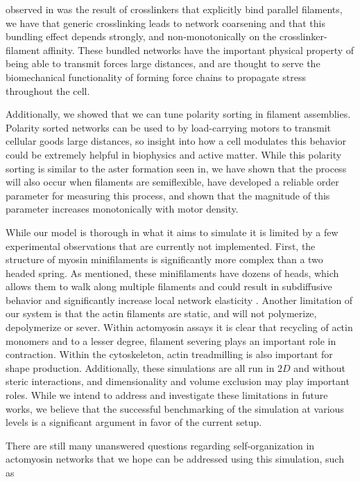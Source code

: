 \documentclass[12pt]{article}
\begin{document}
observed in \cite{kim2009b} was the result of crosslinkers that explicitly bind
parallel filaments, we have that generic crosslinking leads to network
coarsening and that this bundling effect depends strongly, and non-monotonically
on the crosslinker-filament affinity. These bundled networks have the important
physical property of being able to transmit forces large distances, and are
thought to serve the biomechanical functionality of forming force chains to
propagate stress throughout the cell. 
\par
Additionally, we showed that we can tune polarity sorting in filament assemblies. 
Polarity sorted networks can be used to by load-carrying motors to transmit 
cellular goods large distances, so insight into how a cell modulates this
behavior could be extremely helpful in biophysics and active matter. While this
polarity sorting is similar to the aster formation seen in\cite{nedelec2002,
gordon2012}, we have shown that the process will also occur when filaments are
semiflexible, have developed a reliable order parameter for measuring this
process, and shown that the magnitude of this parameter increases
monotonically with motor density. 
\par
While our model is thorough in what it aims to simulate it is limited by a few
experimental observations that are currently not implemented. First, the
structure of myosin minifilaments is significantly more complex than a two
headed spring. As mentioned, these minifilaments have dozens of heads, which
allows them to walk along multiple filaments and could result in subdiffusive
behavior \cite{scholz2016} and significantly increase local network elasticity
\cite{murrellTalk}.
Another limitation of our system is that the actin filaments are static, and
will not polymerize, depolymerize or sever. Within actomyosin assays it is clear
that recycling of actin monomers and to a lesser degree, filament severing 
plays an important role in contraction\cite{murrell2012}. Within the
cytoskeleton, actin treadmilling is also important for shape production.
Additionally, these simulations are all run in $2D$ and without steric
interactions, and dimensionality and volume exclusion may play important roles. 
While we intend to address and investigate these limitations in future works, we
believe that the successful benchmarking of the simulation at various levels is
a significant argument in favor of the current setup.
\par 
There are still many unanswered questions regarding self-organization in
actomyosin networks that we hope can be addressed using this simulation, such as
\end{document}

